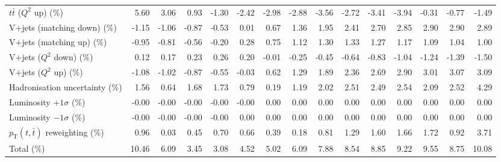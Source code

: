 \begin{table}[htbp]
{\begin{tabular}{lrrrrrrrrrrrrrr}
$t\bar{t}$ ($Q^{2}$ up) (\%) & 5.60 & 3.06 & 0.93 & -1.30 & -2.42 & -2.98 & -2.88 & -3.56 & -2.72 & -3.41 & -3.94 & -0.31 & -0.77 & -1.49 \\ 
V+jets (matching down) (\%) & -1.15 & -1.06 & -0.87 & -0.53 & 0.01 & 0.67 & 1.36 & 1.95 & 2.41 & 2.70 & 2.85 & 2.90 & 2.90 & 2.89 \\ 
V+jets (matching up) (\%) & -0.95 & -0.81 & -0.56 & -0.20 & 0.28 & 0.75 & 1.12 & 1.30 & 1.33 & 1.27 & 1.17 & 1.09 & 1.04 & 1.00 \\ 
V+jets ($Q^{2}$ down) (\%) & 0.12 & 0.17 & 0.23 & 0.26 & 0.20 & -0.01 & -0.25 & -0.45 & -0.64 & -0.83 & -1.04 & -1.24 & -1.39 & -1.50 \\ 
V+jets ($Q^{2}$ up) (\%) & -1.08 & -1.02 & -0.87 & -0.55 & -0.03 & 0.62 & 1.29 & 1.89 & 2.36 & 2.69 & 2.90 & 3.01 & 3.07 & 3.09 \\ 
Hadronisation uncertainty (\%) & 1.56 & 0.64 & 1.68 & 1.73 & 0.79 & 0.19 & 1.19 & 2.02 & 2.51 & 2.49 & 2.54 & 2.09 & 2.52 & 4.29 \\ 
Luminosity $+1\sigma$ (\%) & -0.00 & -0.00 & -0.00 & -0.00 & -0.00 & 0.00 & 0.00 & 0.00 & 0.00 & 0.00 & 0.00 & 0.00 & 0.00 & 0.00 \\ 
Luminosity $-1\sigma$ (\%) & -0.00 & -0.00 & -0.00 & -0.00 & 0.00 & 0.00 & 0.00 & 0.00 & 0.00 & 0.00 & 0.00 & 0.00 & 0.00 & 0.00 \\ 
$p_\mathrm{T}(t,\bar{t})$ reweighting (\%) & 0.96 & 0.03 & 0.45 & 0.70 & 0.66 & 0.39 & 0.18 & 0.81 & 1.29 & 1.60 & 1.66 & 1.72 & 0.92 & 3.71 \\ 
\hline 
Total (\%) & 10.46  & 6.09  & 3.45  & 3.08  & 4.52  & 5.02  & 6.09  & 7.88  & 8.54  & 8.85  & 9.22  & 9.55  & 8.75  & 10.08 \\ 
\hline 
\end{tabular}
}
\end{table}
